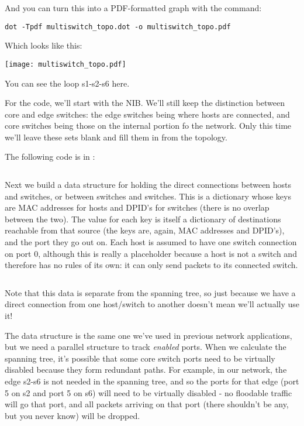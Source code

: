 And you can turn this into a PDF-formatted graph with the command:

\begin{verbatim}
dot -Tpdf multiswitch_topo.dot -o multiswitch_topo.pdf
\end{verbatim}

Which looks like this:

\texttt{[image: multiswitch\_topo.pdf]}

You can see the loop s1-s2-s6 here.

For the code, we'll start with the NIB.  We'll still keep the distinction between core and edge switches:
the edge switches being where hosts are connected, and core switches being those on the internal
portion fo the network.  Only this time we'll leave these sets blank and fill them in from the topology.

The following code is in  :

\inputminted[firstline=15,lastline=16]{python}{code/multiswitch_topologies/network_information_base_from_file.py}

Next we build a data structure for holding the direct connections between hosts and switches, or
between switches and switches.  This is a dictionary whose keys are MAC addresses for hosts and DPID's for
switches (there is no overlap between the two).  The value for each key is itself a dictionary of destinations
reachable from that source (the keys are, again, MAC addresses and DPID's), and the port they go out on.
Each host is assumed to have one switch connection on port 0, although this is really a placeholder because a host is not
a switch and therefore has no rules of its own: it can only send packets to its connected switch.  

\inputminted[firstline=21,lastline=27]{python}{code/multiswitch_topologies/network_information_base_from_file.py}

Note that this data is separate from the spanning tree, so just because we have a direct connection from one
host/switch to another doesn't mean we'll actually use it!

The  data structure is the same one we've used in previous network applications, but
we need a parallel structure to track \emph{enabled} ports.  When we calculate the spanning tree, it's
possible that some core switch ports need to be virtually disabled because they form 
redundant paths.  For example, in our network, the edge s2-s6 is not needed in the spanning tree, and so the ports
for that edge (port 5 on s2 and port 5 on s6) will need to be virtually disabled - no floodable traffic
will go that port, and all packets arriving on that port (there shouldn't be any, but you never know) will
be dropped.

